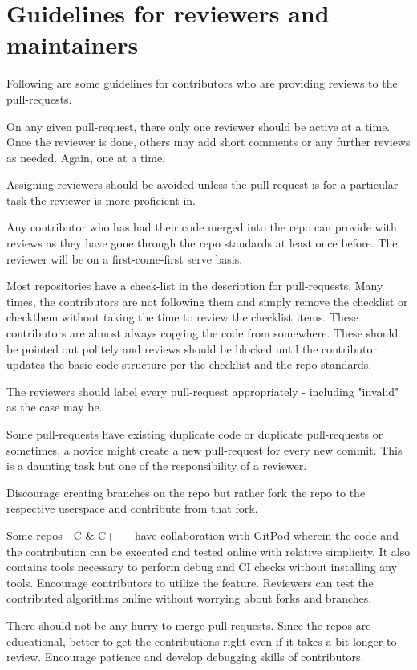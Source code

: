 \chapter{Guidelines for reviewers and maintainers}
\hypertarget{md__r_e_v_i_e_w_e_r___c_o_d_e}{}\label{md__r_e_v_i_e_w_e_r___c_o_d_e}
\label{md__r_e_v_i_e_w_e_r___c_o_d_e_autotoc_md106}%
%


Following are some guidelines for contributors who are providing reviews to the pull-\/requests.


\begin{DoxyEnumerate}
\item On any given pull-\/request, there only one reviewer should be active at a time. Once the reviewer is done, others may add short comments or any further reviews as needed. Again, one at a time.
\item Assigning reviewers should be avoided unless the pull-\/request is for a particular task the reviewer is more proficient in.
\item Any contributor who has had their code merged into the repo can provide with reviews as they have gone through the repo standards at least once before. The reviewer will be on a first-\/come-\/first serve basis.
\item Most repositories have a check-\/list in the description for pull-\/requests. Many times, the contributors are not following them and simply remove the checklist or checkthem without taking the time to review the checklist items. These contributors are almost always copying the code from somewhere. These should be pointed out politely and reviews should be blocked until the contributor updates the basic code structure per the checklist and the repo standards.
\item The reviewers should label every pull-\/request appropriately -\/ including "{}invalid"{} as the case may be.
\item Some pull-\/requests have existing duplicate code or duplicate pull-\/requests or sometimes, a novice might create a new pull-\/request for every new commit. This is a daunting task but one of the responsibility of a reviewer.
\item Discourage creating branches on the repo but rather fork the repo to the respective userspace and contribute from that fork.
\item Some repos -\/ C \& C++ -\/ have collaboration with Git\+Pod wherein the code and the contribution can be executed and tested online with relative simplicity. It also contains tools necessary to perform debug and CI checks without installing any tools. Encourage contributors to utilize the feature. Reviewers can test the contributed algorithms online without worrying about forks and branches.
\item There should not be any hurry to merge pull-\/requests. Since the repos are educational, better to get the contributions right even if it takes a bit longer to review. Encourage patience and develop debugging skills of contributors. 
\end{DoxyEnumerate}